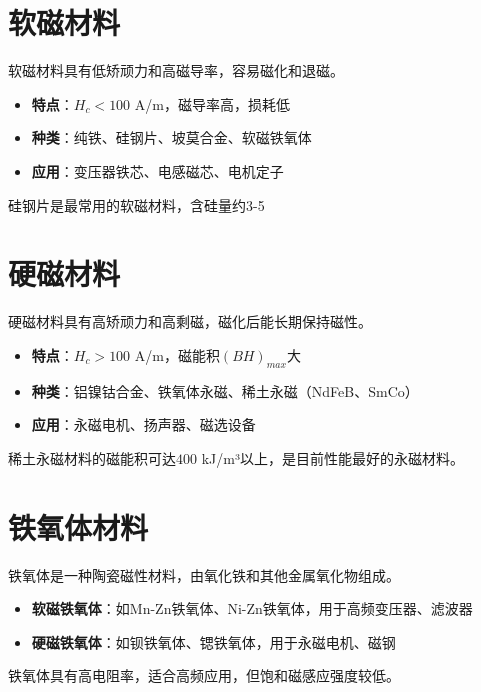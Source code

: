 \section{软磁材料}
\label{sec:soft_magnetic_materials}

软磁材料具有低矫顽力和高磁导率，容易磁化和退磁。

\begin{itemize}
    \item \textbf{特点}：$H_c < 100$ A/m，磁导率高，损耗低
    \item \textbf{种类}：纯铁、硅钢片、坡莫合金、软磁铁氧体
    \item \textbf{应用}：变压器铁芯、电感磁芯、电机定子
\end{itemize}

硅钢片是最常用的软磁材料，含硅量约3-5%

\section{硬磁材料}
\label{sec:hard_magnetic_materials}

硬磁材料具有高矫顽力和高剩磁，磁化后能长期保持磁性。

\begin{itemize}
    \item \textbf{特点}：$H_c > 100$ A/m，磁能积$(BH)_{max}$大
    \item \textbf{种类}：铝镍钴合金、铁氧体永磁、稀土永磁（NdFeB、SmCo）
    \item \textbf{应用}：永磁电机、扬声器、磁选设备
\end{itemize}

稀土永磁材料的磁能积可达$400$ kJ/m³以上，是目前性能最好的永磁材料。

\section{铁氧体材料}
\label{sec:ferrite_materials}

铁氧体是一种陶瓷磁性材料，由氧化铁和其他金属氧化物组成。

\begin{itemize}
    \item \textbf{软磁铁氧体}：如Mn-Zn铁氧体、Ni-Zn铁氧体，用于高频变压器、滤波器
    \item \textbf{硬磁铁氧体}：如钡铁氧体、锶铁氧体，用于永磁电机、磁钢
\end{itemize}

铁氧体具有高电阻率，适合高频应用，但饱和磁感应强度较低。


